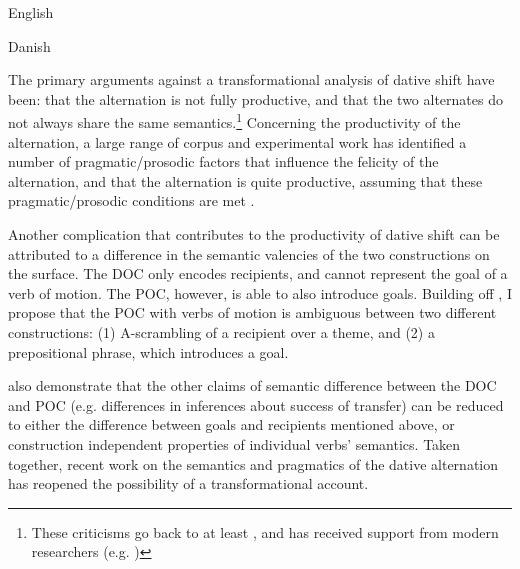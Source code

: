 \begin{exe}
\ex English
\begin{xlist}
\end{xlist}
\ex Danish
\begin{xlist}
\end{xlist}
\end{exe}

The primary arguments against a transformational analysis of dative shift have been: that the alternation is not fully productive, and that the two alternates do not always share the same semantics.\footnote{These criticisms go back to at least \cite{Oehrle.1976}, and has received support from modern researchers (e.g. \cite{Harley.2002,Bruening.2010,Bruening.2010b,Bruening.2012})} Concerning the productivity of the alternation, a large range of corpus and experimental work has identified a number of pragmatic/prosodic factors that influence the felicity of the alternation, and that the alternation is quite productive, assuming that these pragmatic/prosodic conditions are met \citep{Collins.1995,Bresnan.2007,Bresnan.2009}. 

Another complication that contributes to the productivity of dative shift can be attributed to a difference in the semantic valencies of the two constructions on the surface\citep{Hovav.2008}. The DOC only encodes recipients, and cannot represent the goal of a verb of motion. The POC, however, is able to also introduce goals. Building off \cite{Levinson.2005}, I propose that the POC with verbs of motion is ambiguous between two different constructions: (1) A-scrambling of a recipient over a theme, and (2) a prepositional phrase, which introduces a goal.

\cite{Hovav.2008} also demonstrate that the other claims of semantic difference between the DOC and POC (e.g. differences in inferences about success of transfer) can be reduced to either the difference between goals and recipients mentioned above, or construction independent properties of individual verbs' semantics. Taken together, recent work on the semantics and pragmatics of the dative alternation has reopened the possibility of a transformational account.

